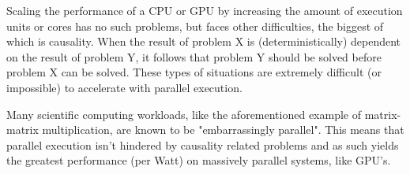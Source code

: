 Scaling the performance of a CPU or GPU by increasing the amount of execution units or cores has no such problems, but faces other difficulties, the biggest of which is causality. When the result of problem X is (deterministically) dependent on the result of problem Y, it follows that problem Y should be solved before problem X can be solved. These types of situations are extremely difficult (or impossible) to accelerate with parallel execution.\vspace{5mm}

Many scientific computing workloads, like the aforementioned example of matrix-matrix multiplication, are known to be "embarrassingly parallel"\autocite[]{wiki_embarrassing}. This means that parallel execution isn't hindered by causality related problems and as such yields the greatest performance (per Watt) on massively parallel systems, like GPU's.
